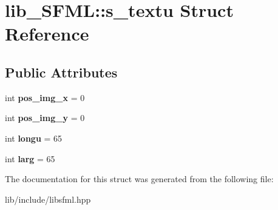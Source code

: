 \section{lib\+\_\+\+S\+F\+ML\+:\+:s\+\_\+textu Struct Reference}
\label{structlib___s_f_m_l_1_1s__textu}
\subsection*{Public Attributes}
\begin{DoxyCompactItemize}
\item 
\mbox{\label{structlib___s_f_m_l_1_1s__textu_a6e7497bb324d6ee127d3fe8af82b7a2b}} 
int {\bfseries pos\+\_\+img\+\_\+x} = 0
\item 
\mbox{\label{structlib___s_f_m_l_1_1s__textu_a8ed5fd3d7656bae6666b5af4c8dfde02}} 
int {\bfseries pos\+\_\+img\+\_\+y} = 0
\item 
\mbox{\label{structlib___s_f_m_l_1_1s__textu_af152c7de9fa637cfe8147541856eb41b}} 
int {\bfseries longu} = 65
\item 
\mbox{\label{structlib___s_f_m_l_1_1s__textu_a2948a6100bc539a45dd53517096f9c51}} 
int {\bfseries larg} = 65
\end{DoxyCompactItemize}


The documentation for this struct was generated from the following file\+:\begin{DoxyCompactItemize}
\item 
lib/include/libsfml.\+hpp\end{DoxyCompactItemize}
